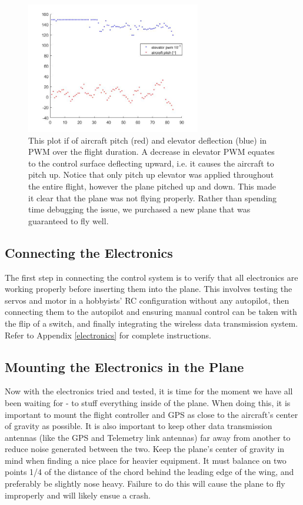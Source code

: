 \documentclass[12pt,journal,compsoc]{IEEEtran}
\begin{document}
\begin{figure}[h!]
\hspace*{0cm}
\centering
\includegraphics[width=3in]{pitch_elevPWM.jpg}
\caption{This plot if of aircraft pitch (red) and elevator deflection (blue) in PWM over the flight duration. A decrease in elevator PWM equates to the control surface deflecting upward, i.e. it causes the aircraft to pitch up. Notice that only pitch up elevator was applied throughout the entire flight, however the plane pitched up and down. This made it clear that the plane was not flying properly. Rather than spending time debugging the issue, we purchased a new plane that was guaranteed to fly well.}
\label{pitchOsc}
\end{figure}
\subsection{Connecting the Electronics}
The first step in connecting the control system is to verify that all electronics are working properly before inserting them into the plane. This involves testing the servos and motor in a hobbyists' RC configuration without any autopilot, then connecting them to the autopilot and ensuring manual control can be taken with the flip of a switch, and finally integrating the wireless data transmission system. Refer to Appendix \ref{electronics} for complete instructions.

\subsection{Mounting the Electronics in the Plane}
Now with the electronics tried and tested, it is time for the moment we have all been waiting for - to stuff everything inside of the plane. When doing this, it is important to mount the flight controller and GPS as close to the aircraft's center of gravity as possible. It is also important to keep other data transmission antennas (like the GPS and Telemetry link antennas) far away from another to reduce noise generated between the two. Keep the plane's center of gravity in mind when finding a nice place for heavier equipment. It must balance on two points 1/4 of the distance of the chord behind the leading edge of the wing, and preferably be slightly nose heavy. Failure to do this will cause the plane to fly improperly and will likely ensue a crash.
\end{document}
